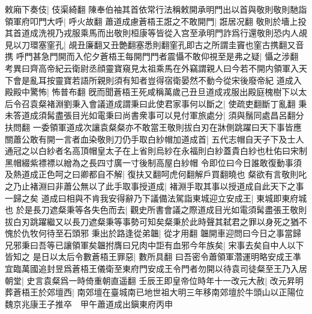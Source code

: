 敕廂下奏伎|{
	伎渠綺翻}
陳奉伯袖其首依常行法稱敕開承明門出以首與敬則敬則馳詣領軍府叩門大呼|{
	呼火故翻}
蕭道成慮蒼梧王誑之不敢開門|{
	誑居况翻}
敬則於墻上投其首道成洗視乃戎服乘馬而出敬則桓康等皆從入宫至承明門詐爲行還敬則恐内人覘見以刀環塞窐孔|{
	覘丑廉翻又丑艶翻塞悉則翻窐孔即古之所謂圭竇也窐古携翻又音携}
呼門甚急門開而入佗夕蒼梧王每開門門者震懾不敢仰視至是弗之疑|{
	懾之涉翻　考異曰齊高帝紀云衛尉丞顔靈寶窺見太祖乘馬在外竊謂親人曰今若不開内領軍入天下會是亂耳按靈寶若語所親則須有知者豈得宿衛晏然不動今從宋後廢帝紀}
道成入殿殿中驚怖|{
	怖普布翻}
旣而聞蒼梧王死咸稱萬歲己丑旦道成戎服出殿庭槐樹下以太后令召袁粲褚淵劉秉入會議道成謂秉曰此使君家事何以斷之|{
	使疏吏翻斷丁亂翻}
秉未答道成須髯盡張目光如電秉曰尚書衆事可以見付軍旅處分|{
	須與鬚同處昌呂翻分扶問翻}
一委領軍道成次讓袁粲粲亦不敢當王敬則拔白刃在牀側跳躍曰天下事皆應關蕭公敢有開一言者血染敬則刀仍手取白紗帽加道成首|{
	五代志帽自天子下及士人通冠之以白紗者名高頂帽皇太子在上省則烏紗在永福則白紗蓋貴白紗也杜佑曰宋制黑帽綴紫褾褾以繒為之長四寸廣一寸後制高屋白紗帽}
令即位曰今日誰敢復動事須及熱道成正色呵之曰卿都自不解|{
	復扶又翻呵虎何翻解戶買翻曉也}
粲欲有言敬則叱之乃止褚淵曰非蕭公無以了此手取事授道成|{
	褚淵手取其事以授道成自此天下之事一歸之矣}
道成曰相與不肯我安得辭乃下議備法駕詣東城迎立安成王|{
	東城即東府城也}
於是長刀遮粲秉等各失色而去|{
	觀史所書會議之際道成目光如電須髯盡張王敬則拔白刃跳躍繼又以長刀遮粲秉等事勢可知矣粲秉於此時聲其弑君之罪以身死之猶不愧於仇牧何待至石頭邪}
秉出於路逢從弟韞|{
	從才用翻}
韞開車迎問曰今日之事當歸兄邪秉曰吾等已讓領軍矣韞拊膺曰兄肉中詎有血邪今年族矣|{
	宋事去矣自中人以下皆知之}
是日以太后令數蒼梧王罪惡|{
	數所具翻}
曰吾密令蕭領軍濳運明略安成王凖宜臨萬國追封昱爲蒼梧王儀衛至東府門安成王令門者勿開以待袁司徒粲至王乃入居朝堂|{
	史言袁粲爲一時倚重朝直遥翻}
壬辰王即皇帝位時年十一改元大赦|{
	改元昇明}
葬蒼梧王於郊壇西|{
	南郊壇在臺城南已地世祖大明三年移南郊壇於牛頭山以正陽位}
魏京兆康王子推卒　甲午蕭道成出鎭東府丙申

